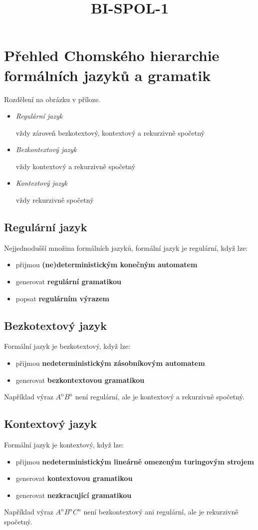 \documentclass{szzclass}
\begin{document}
\title{BI-SPOL-1}
\section{Přehled Chomského hierarchie formálních ja\-zyků a gramatik}

Rozdělení na obrázku v příloze.

\begin{itemize}
    \item \textit{Regulární jazyk} 
     
    vždy zároveň bezkotextový, kontextový a rekurzivně spočetný
    \item \textit{Bezkontextový jazyk}
    
    vždy kontextový a rekurzivně spočetný
    \item \textit{Kontextový jazyk}
     
    vždy rekurzivně spočetný
\end{itemize}

\subsection{Regulární jazyk}
Nejjednodušší množina formálních jazyků, formální jazyk je regulární, když lze:
\begin{itemize}
	\item přijmou \textbf{(ne)deterministickým konečným automatem}
	\item generovat \textbf{regulární gramatikou}
	\item popsat \textbf{regulárním výrazem}
\end{itemize}

\subsection{Bezkotextový jazyk}
Formální jazyk je bezkotextový, když lze:
\begin{itemize}
	\item přijmou \textbf{nedeterministickým zásobníkovým automatem}
	\item generovat \textbf{bezkontextovou gramatikou}
\end{itemize}
Například výraz $A^nB^n$ není regulární, ale je kontextový a rekurzivně spočetný.

\subsection{Kontextový jazyk}
Formální jazyk je kontextový, když lze:
\begin{itemize}
	\item přijmou \textbf{nedeterministickým lineárně omezeným turingovým strojem}
	\item generovat \textbf{kontextovou gramatikou}
	\item generovat \textbf{nezkracující gramatikou}
\end{itemize}
Například výraz $A^nB^nC^n$ není bezkontextový ani regulární, ale je rekurzivně spočetný. 
\end{document}
